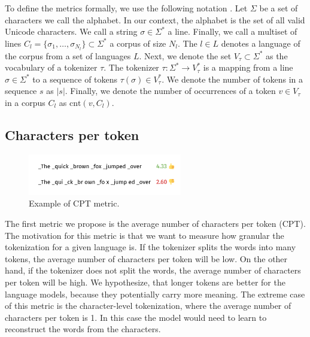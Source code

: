 To define the metrics formally, we use the following notation \cite{zouhar_tokenization_2023}. Let $\Sigma$ be a set of characters we call the alphabet. In our context, the alphabet is the set of all valid Unicode characters. We call a string $\sigma \in \Sigma^*$ a line. Finally, we call a multiset of lines $C_l = \{ \sigma_1, \ldots, \sigma_{N_l} \} \subset \Sigma^*$ a corpus of size $N_l$. The $l \in L$ denotes a language of the corpus from a set of languages $L$. Next, we denote the set $V_\tau \subset \Sigma^*$ as the vocabulary of a tokenizer $\tau$. The tokenizer $\tau: \Sigma^* \rightarrow V_\tau^*$ is a mapping from a line $\sigma \in \Sigma^*$ to a sequence of tokens $\tau(\sigma) \in V_\tau^*$. We denote the number of tokens in a sequence $s$ as $|s|$. Finally, we denote the number of occurrences of a token $v \in V_\tau$ in a corpus $C_l$ as $\textrm{cnt}(v, C_l)$.


\subsection{Characters per token}

\begin{figure}[h]
    \centering
    \includegraphics[width=0.6\textwidth]{img/temp/cpt_example.png}
    \caption{Example of CPT metric.}
    \label{fig:cpt_example}
\end{figure}

The first metric we propose is the average number of characters per token (CPT). The motivation for this metric is that we want to measure how granular the tokenization for a given language is. If the tokenizer splits the words into many tokens, the average number of characters per token will be low. On the other hand, if the tokenizer does not split the words, the average number of characters per token will be high. We hypothesize, that longer tokens are better for the language models, because they potentially carry more meaning. The extreme case of this metric is the character-level tokenization, where the average number of characters per token is 1. In this case the model would need to learn to reconstruct the words from the characters.

